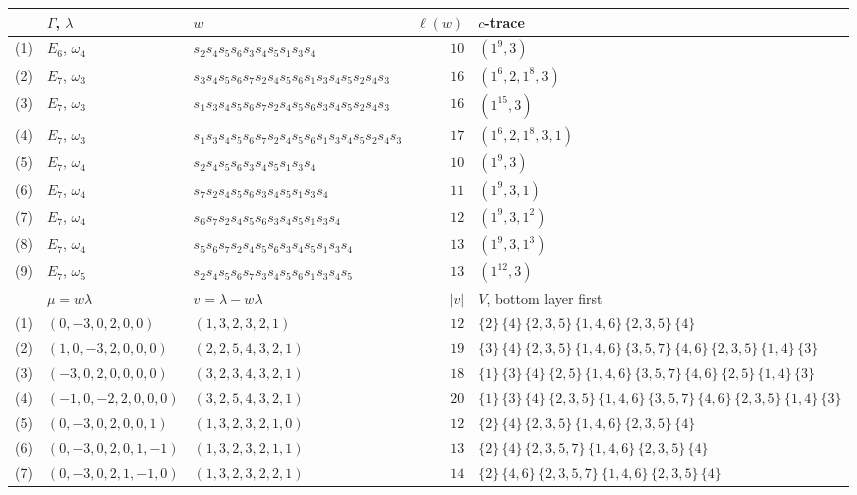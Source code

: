 \documentclass[reqno]{amsart}
\theoremstyle{plain}
\theoremstyle{definition}
\newcommand{\la}{\lambda}
\newcommand{\om}{\omega}
\begin{document}
\begin{table}[ht]
\scriptsize
\setlength{\tabcolsep}{4pt}
\begin{tabular}{@{}rllrl@{}}
\toprule
 & $\Gamma$, $\la$ & $w$ & $\ell(w)$ & $c$-trace \\
\midrule
(1) & $E_6$, $\om_4$ & $s_2s_4s_5s_6s_3s_4s_5s_1s_3s_4$ & $10$ & $(1^9,3)$ \\
(2) & $E_7$, $\om_3$ & $s_3s_4s_5s_6s_7s_2s_4s_5s_6s_1s_3s_4s_5s_2s_4s_3$ & $16$ & $(1^6,2,1^8,3)$ \\
(3) & $E_7$, $\om_3$ & $s_1s_3s_4s_5s_6s_7s_2s_4s_5s_6s_3s_4s_5s_2s_4s_3$ & $16$ & $(1^{15},3)$ \\
(4) & $E_7$, $\om_3$ & $s_1s_3s_4s_5s_6s_7s_2s_4s_5s_6s_1s_3s_4s_5s_2s_4s_3$ & $17$ & $(1^6,2,1^8,3,1)$ \\
(5) & $E_7$, $\om_4$ & $s_2s_4s_5s_6s_3s_4s_5s_1s_3s_4$ & $10$ & $(1^9,3)$ \\
(6) & $E_7$, $\om_4$ & $s_7s_2s_4s_5s_6s_3s_4s_5s_1s_3s_4$ & $11$ & $(1^9,3,1)$ \\
(7) & $E_7$, $\om_4$ & $s_6s_7s_2s_4s_5s_6s_3s_4s_5s_1s_3s_4$ & $12$ & $(1^9,3,1^2)$ \\
(8) & $E_7$, $\om_4$ & $s_5s_6s_7s_2s_4s_5s_6s_3s_4s_5s_1s_3s_4$ & $13$ & $(1^9,3,1^3)$ \\
(9) & $E_7$, $\om_5$ & $s_2s_4s_5s_6s_7s_3s_4s_5s_6s_1s_3s_4s_5$ & $13$ & $(1^{12},3)$ \\
\midrule
 & $\mu=w\la$ & $v=\la-w\la$ & $|v|$ & $V$, bottom layer first \\
\midrule
(1) & $(0,-3,0,2,0,0)$ & $(1,3,2,3,2,1)$ & $12$ & $\{2\}\,\{4\}\,\{2,3,5\}\,\{1,4,6\}\,\{2,3,5\}\,\{4\}$ \\
(2) & $(1,0,-3,2,0,0,0)$ & $(2,2,5,4,3,2,1)$ & $19$ & $\{3\}\,\{4\}\,\{2,3,5\}\,\{1,4,6\}\,\{3,5,7\}\,\{4,6\}\,\{2,3,5\}\,\{1,4\}\,\{3\}$ \\
(3) & $(-3,0,2,0,0,0,0)$ & $(3,2,3,4,3,2,1)$ & $18$ & $\{1\}\,\{3\}\,\{4\}\,\{2,5\}\,\{1,4,6\}\,\{3,5,7\}\,\{4,6\}\,\{2,5\}\,\{1,4\}\,\{3\}$ \\
(4) & $(-1,0,-2,2,0,0,0)$ & $(3,2,5,4,3,2,1)$ & $20$ & $\{1\}\,\{3\}\,\{4\}\,\{2,3,5\}\,\{1,4,6\}\,\{3,5,7\}\,\{4,6\}\,\{2,3,5\}\,\{1,4\}\,\{3\}$ \\
(5) & $(0,-3,0,2,0,0,1)$ & $(1,3,2,3,2,1,0)$ & $12$ & $\{2\}\,\{4\}\,\{2,3,5\}\,\{1,4,6\}\,\{2,3,5\}\,\{4\}$ \\
(6) & $(0,-3,0,2,0,1,-1)$ & $(1,3,2,3,2,1,1)$ & $13$ & $\{2\}\,\{4\}\,\{2,3,5,7\}\,\{1,4,6\}\,\{2,3,5\}\,\{4\}$ \\
(7) & $(0,-3,0,2,1,-1,0)$ & $(1,3,2,3,2,2,1)$ & $14$ & $\{2\}\,\{4,6\}\,\{2,3,5,7\}\,\{1,4,6\}\,\{2,3,5\}\,\{4\}$ \\

\end{tabular}
\end{table}
\end{document}
